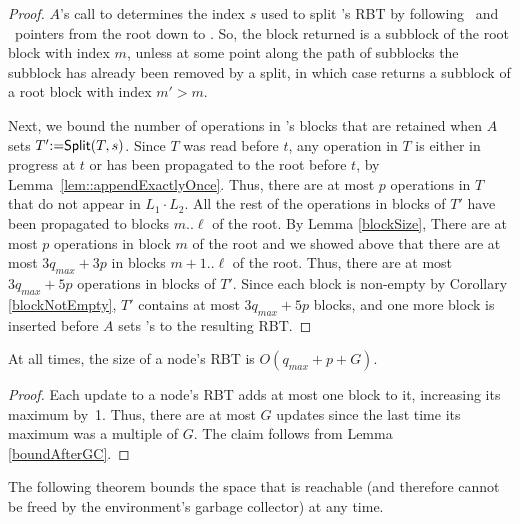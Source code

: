 \begin{proof}
$A$'s call to  determines the index $s$ used to split 's RBT by following 
\eleft\ and \eright\ pointers from the root down to .
So, the block returned is a subblock of the root block with index $m$, unless
at some point along the path of subblocks the subblock has already been removed by a split,
in which case  returns a subblock of a root block with index $m'>m$.

Next, we bound the number of operations in 's blocks that are retained when $A$  sets
$T'\mbox{:=}{\sf Split}(T,s)$.
Since $T$ was read before $t$, any operation in $T$ is either in progress at $t$ or has been propagated to the root before $t$, by Lemma~\ref{lem::appendExactlyOnce}.
Thus, there are at most $p$ operations in $T$ that do not appear in $L_1\cdot L_2$.
All the rest of the operations in blocks of $T'$ have been propagated to blocks $m..\ell$ of the root.
By Lemma \ref{blockSize}, There are at most $p$ operations in block $m$ of the root 
and we showed above that there are at most $3q_{max} + 3p$ in blocks 
$m+1..\ell$ of the root.
Thus, there are at most $3q_{max}+5p$ operations in blocks of $T'$.
Since each block is non-empty by Corollary \ref{blockNotEmpty}, $T'$ contains at most $3q_{max}+5p$ blocks, and one more 
block is inserted before $A$ sets 's  to the resulting RBT.
\end{proof}


\begin{corollary}\label{RBTbound}
At all times, the size of a node's RBT is $O(q_{max}+p+G)$. 
\end{corollary}
\begin{proof}
Each update to a node's RBT adds at most one block to it, increasing its maximum  by~1.
Thus, there are at most $G$ updates since the last time its maximum  was a multiple of $G$.
The claim follows from Lemma \ref{boundAfterGC}.
\end{proof}

The following theorem bounds the space that is reachable (and therefore cannot be freed by the environment's garbage collector) at any time.

